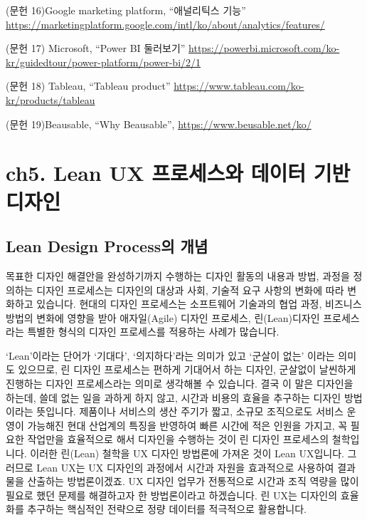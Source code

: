 \documentclass[
  letterpaper,
]{book}
\begin{document}
(문헌 16)Google marketing platform, ``애널리틱스 기능''
\url{https://marketingplatform.google.com/intl/ko/about/analytics/features/}

(문헌 17) Microsoft, ``Power BI 둘러보기''
\url{https://powerbi.microsoft.com/ko-kr/guidedtour/power-platform/power-bi/2/1}

(문헌 18) Tableau, ``Tableau product''
\url{https://www.tableau.com/ko-kr/products/tableau}

(문헌 19)Beausable, ``Why Beausable'',
\url{https://www.beusable.net/ko/}

\chapter{ch5. Lean UX 프로세스와 데이터 기반
디자인}\label{ch5.-lean-ux-uxd504uxb85cuxc138uxc2a4uxc640-uxb370uxc774uxd130-uxae30uxbc18-uxb514uxc790uxc778}

\section{Lean Design Process의
개념}\label{lean-design-processuxc758-uxac1cuxb150}

목표한 디자인 해결안을 완성하기까지 수행하는 디자인 활동의 내용과 방법,
과정을 정의하는 디자인 프로세스는 디자인의 대상과 사회, 기술적 요구
사항의 변화에 따라 변화하고 있습니다. 현대의 디자인 프로세스는
소프트웨어 기술과의 협업 과정, 비즈니스 방법의 변화에 영향을 받아
애자일(Agile) 디자인 프로세스, 린(Lean)디자인 프로세스라는 특별한 형식의
디자인 프로세스를 적용하는 사례가 많습니다.

`Lean'이라는 단어가 `기대다', `의지하다'라는 의미가 있고 `군살이 없는'
이라는 의미도 있으므로, 린 디자인 프로세스는 편하게 기대어서 하는
디자인, 군살없이 날씬하게 진행하는 디자인 프로세스라는 의미로 생각해볼
수 있습니다. 결국 이 말은 디자인을 하는데, 쓸데 없는 일을 과하게 하지
않고, 시간과 비용의 효율을 추구하는 디자인 방법이라는 뜻입니다. 제품이나
서비스의 생산 주기가 짧고, 소규모 조직으로도 서비스 운영이 가능해진 현대
산업계의 특징을 반영하여 빠른 시간에 적은 인원을 가지고, 꼭 필요한
작업만을 효율적으로 해서 디자인을 수행하는 것이 린 디자인 프로세스의
철학입니다. 이러한 린(Lean) 철학을 UX 디자인 방법론에 가져온 것이 Lean
UX입니다. 그러므로 Lean UX는 UX 디자인의 과정에서 시간과 자원을
효과적으로 사용하여 결과물을 산출하는 방법론이겠죠. UX 디자인 업무가
전통적으로 시간과 조직 역량을 많이 필요로 했던 문제를 해결하고자 한
방법론이라고 하겠습니다. 린 UX는 디자인의 효율화를 추구하는 핵심적인
전략으로 정량 데이터를 적극적으로 활용합니다.
\end{document}
